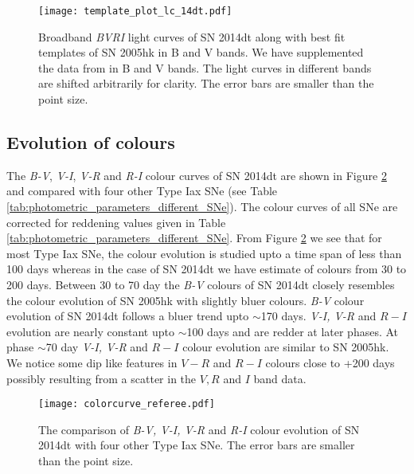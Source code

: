 \documentclass[fleqn,usenatbib]{mnras}
\begin{document}
\begin{figure}
	\begin{center}
		\texttt{[image: template\_plot\_lc\_14dt.pdf]}
	\end{center}
	\caption{Broadband {\it BVRI} light curves of SN 2014dt along with best fit templates of SN 2005hk in B and V bands. We have supplemented the data from \citet{2016ApJ...816L..13F} in B and V bands. The light curves in different bands are shifted arbitrarily for clarity. The error bars are smaller than the point size.}
	\label{fig:light_curve_template_plot}
\end{figure}
 
\subsection{Evolution of colours}

The {\it B-V}, {\it V-I}, {\it V-R} and {\it R-I} colour curves of SN 2014dt are shown in Figure \ref{fig:color_curve} and compared with four other Type Iax SNe (see Table \ref{tab:photometric_parameters_different_SNe}). The colour curves of all SNe are corrected for reddening values given in Table \ref{tab:photometric_parameters_different_SNe}. From Figure \ref{fig:color_curve} we see that for most Type Iax SNe, the colour evolution is studied upto a time span of less than 100 days whereas in the case of SN 2014dt we have estimate of colours from 30 to 200 days. Between 30 to 70 day the {\it B-V} colours of SN 2014dt closely resembles the colour evolution of SN 2005hk with slightly bluer colours. {\it B-V} colour evolution of SN 2014dt follows a bluer trend upto $\sim$170 days. {\it V-I, V-R} and $R-I$ evolution are nearly constant upto $\sim$100 days and are redder at later phases. At phase $\sim$70 day {\it V-I, V-R} and $R-I$ colour evolution are similar to SN 2005hk. We notice some dip like features in $V-R$ and $R-I$ colours close to +200 days possibly resulting from a scatter in the $V,R$ and $I$ band data.



\begin{figure}
	\begin{center}
		\texttt{[image: colorcurve\_referee.pdf]}
	\end{center}
	\caption{The comparison of {\it B-V, V-I, V-R} and {\it R-I} colour evolution of SN 2014dt with four other Type Iax SNe. The error bars are smaller than the point size.}
	\label{fig:color_curve}
\end{figure}
  
\end{document}
